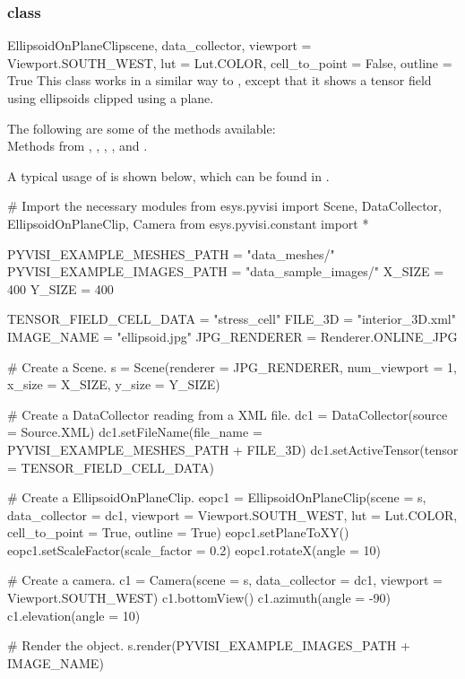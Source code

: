 \subsubsection{\EllipsoidOnPlaneClip class}

\begin{classdesc}{EllipsoidOnPlaneClip}{scene, data_collector,
viewport = Viewport.SOUTH_WEST, lut = Lut.COLOR, cell_to_point = False, 
outline = True}
This class works in a similar way to \MapOnPlaneClip, except that it shows a 
tensor field using ellipsoids clipped using a plane.
\end{classdesc}
        
The following are some of the methods available:\\
Methods from \ActorThreeD, \Sphere, \TensorGlyph, \Transform, \Clipper 
and \MaskPoints.

A typical usage of \EllipsoidOnPlaneClip is shown below, which can be found in 
\texttt{\PyvisiExampleDirectory}.

\begin{python}
# Import the necessary modules
from esys.pyvisi import Scene, DataCollector, EllipsoidOnPlaneClip, Camera
from esys.pyvisi.constant import *

PYVISI_EXAMPLE_MESHES_PATH = "data_meshes/"
PYVISI_EXAMPLE_IMAGES_PATH = "data_sample_images/"
X_SIZE = 400
Y_SIZE = 400

TENSOR_FIELD_CELL_DATA = "stress_cell"
FILE_3D = "interior_3D.xml"
IMAGE_NAME = "ellipsoid.jpg"
JPG_RENDERER = Renderer.ONLINE_JPG

# Create a Scene.
s = Scene(renderer = JPG_RENDERER, num_viewport = 1, x_size = X_SIZE, 
        y_size = Y_SIZE)

# Create a DataCollector reading from a XML file.
dc1 = DataCollector(source = Source.XML)
dc1.setFileName(file_name = PYVISI_EXAMPLE_MESHES_PATH + FILE_3D)
dc1.setActiveTensor(tensor = TENSOR_FIELD_CELL_DATA)

# Create a EllipsoidOnPlaneClip.
eopc1 = EllipsoidOnPlaneClip(scene = s, data_collector = dc1, 
        viewport = Viewport.SOUTH_WEST, lut = Lut.COLOR, cell_to_point = True, 
        outline = True)
eopc1.setPlaneToXY()
eopc1.setScaleFactor(scale_factor = 0.2)
eopc1.rotateX(angle = 10)

# Create a camera.
c1 = Camera(scene = s, data_collector = dc1, viewport = Viewport.SOUTH_WEST)
c1.bottomView()
c1.azimuth(angle = -90)
c1.elevation(angle = 10)

# Render the object.
s.render(PYVISI_EXAMPLE_IMAGES_PATH + IMAGE_NAME)
\end{python}

